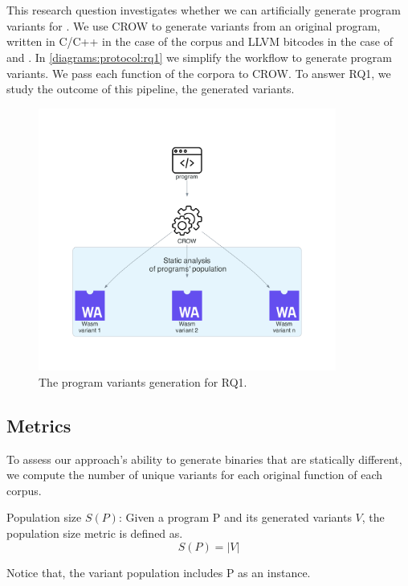 
\section{\rqone}
\label{rq1:method}
This research question investigates whether we can artificially generate program variants for \wasm. We use CROW to generate variants from an original program, written in C/C++ in the case of the \corpusrosetta corpus and LLVM bitcodes in the case of \corpussodium and \corpusqrcode. 
In \autoref{diagrams:protocol:rq1} we simplify the workflow to generate \wasm program variants. We pass each function of the corpora to CROW. To answer RQ1, we study the outcome of this pipeline, the generated variants. 


\begin{figure}[h]
    \centering
    \includegraphics[height=3.4in]{diagrams/RQ1.pdf}
    \caption{The program variants generation for RQ1.}
    \label{diagrams:protocol:rq1}
\end{figure}


\subsection*{Metrics}

To assess our approach's ability to generate \wasm binaries that are statically different, we compute the number of unique variants for each original function of each corpus. 

\begin{metric}{Population size $S(P)$:}\label{metric:md5sum}
    Given a program P and its generated variants $V$, the population size metric is defined as.\\
    $$
        S(P)=|V|
    $$

    Notice that, the variant population includes P as an instance.
\end{metric}

